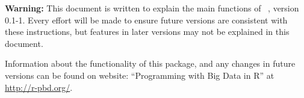{\color{red} \bf Warning:} This document is written to explain the main
functions of ~\citep{Schmidt2013pbdDEMOpackage}, version 0.1-1.
Every effort will be made to ensure future versions are consistent with
these instructions, but features in later versions may not be explained
in this document.

Information about the functionality of this package,
and any changes in future versions can be found on website:
``Programming with Big Data in R'' at
\url{http://r-pbd.org/}.

